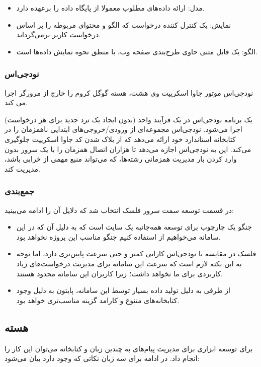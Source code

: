 \begin{itemize}
    \item مدل: ارائه داده‌های مطلوب معمولا از پایگاه داده را برعهده دارد.
    \item نمایش: یک کنترل کننده درخواست که الگو و محتوای مربوطه را بر اساس درخواست کاربر برمی‌گرداند.
    \item الگو: یک فایل متنی حاوی طرح‌بندی صفحه وب، با منطق نحوه نمایش داده‌ها است.
\end{itemize}


\subsubsection{نودجی‌اس}
نودجی‌اس موتور جاوا اسکریپت وی هشت، هسته گوگل کروم را خارج از مرورگر اجرا می کند.

یک برنامه نودجی‌اس در یک فرآیند واحد (بدون ایجاد یک ترد جدید برای هر درخواست) اجرا می‌شود. نودجی‌اس مجموعه‌ای از ورودی/خروجی‌های ابتدایی ناهمزمان را در کتابخانه استاندارد خود ارائه می‌دهد که از بلاک شدن کد جاوا اسکریپت جلوگیری می‌کند. این به نودجی‌اس اجازه می‌دهد تا هزاران اتصال همزمان را با یک سرور بدون وارد کردن بار مدیریت همزمانی رشته‌ها، که می‌تواند منبع مهمی از خرابی باشد، مدیریت کند.

\subsubsection{جمع‌بندی}
در قسمت توسعه سمت سرور فلسک انتخاب شد که دلایل آن را ادامه می‌بینید:
\begin{itemize}
    \item جنگو یک چارچوب برای توسعه همه‌جانبه یک سایت است که به دلیل آن که در این سامانه می‌خواهیم از  استفاده کنیم جنگو مناسب این پروژه نخواهد بود.
    \item فلسک در مقایسه با نودجی‌اس کارایی کمتر و حتی سرعت پایین‌تری دارد، اما توجه به این نکته لازم است که سرعت این سامانه برای مدیریت درخواست‌های زیاد کاربردی برای ما نخواهد داشت؛ زیرا کاربران این سامانه محدود هستند.
    \item از طرفی به دلیل تولید داده بسیار توسط این سامانه، پایتون به دلیل وجود کتابخانه‌های متنوع و کارامد گزینه مناسب‌تری خواهد بود. 
\end{itemize}


\subsection{هسته }
برای توسعه ابزاری برای مدیریت پیام‌های  به چندین زبان و کتابخانه می‌توان این کار را انجام داد. در ادامه برای سه زبان نکاتی که وجود دارد بیان می‌شود:

